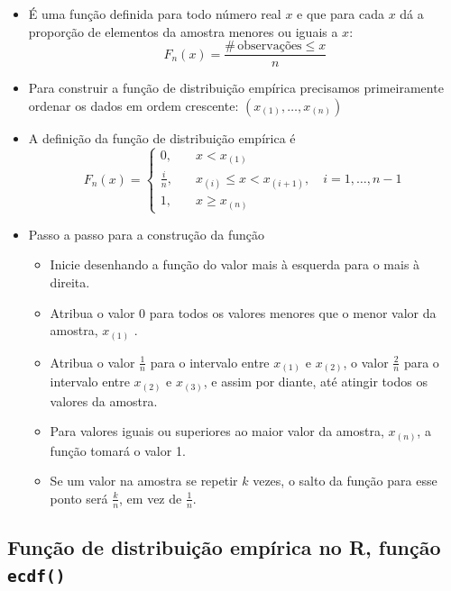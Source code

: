 \documentclass[
]{book}
\providecommand{\tightlist}{%
  \setlength{\itemsep}{0pt}\setlength{\parskip}{0pt}}
\begin{document}
\begin{itemize}
\item
  É uma função definida para todo número real \(x\) e que para cada \(x\)
  dá a proporção de elementos da amostra menores ou iguais a \(x\):
  \[F_{n}(x) = \frac{\# \, \text{observações} \leq x}{n}\]
\item
  Para construir a função de distribuição empírica precisamos
  primeiramente ordenar os dados em ordem crescente:
  \((x_{(1)},\ldots,x_{(n)})\)
\item
  A definição da função de distribuição empírica é
  \[F_{n}(x) = \begin{cases}
    0, & \quad x < x_{(1)} \\
    \frac{i}{n}, & \quad x_{(i)}\leq x < x_{(i+1)}, \quad i=1,\ldots,n-1 \\
    1, & \quad x\geq x_{(n)}
  \end{cases}\]
\item
  Passo a passo para a construção da função

  \begin{itemize}
  \tightlist
  \item
    Inicie desenhando a função do valor mais à esquerda para o mais
    à direita.
  \item
    Atribua o valor 0 para todos os valores menores que o menor
    valor da amostra, \(x_{(1)}\) .
  \item
    Atribua o valor \(\frac{1}{n}\) para o intervalo entre \(x_{(1)}\) e
    \(x_{(2)}\), o valor \(\frac{2}{n}\) para o intervalo entre
    \(x_{(2)}\) e \(x_{(3)}\), e assim por diante, até atingir todos os
    valores da amostra.
  \item
    Para valores iguais ou superiores ao maior valor da amostra,
    \(x_{(n)}\), a função tomará o valor 1.
  \item
    Se um valor na amostra se repetir \(k\) vezes, o salto da função
    para esse ponto será \(\frac{k}{n}\), em vez de \(\frac{1}{n}\).
  \end{itemize}
\end{itemize}

\subsection{\texorpdfstring{Função de distribuição empírica no R, função \texttt{ecdf()}}{Função de distribuição empírica no R, função ecdf()}}\label{funuxe7uxe3o-de-distribuiuxe7uxe3o-empuxedrica-no-r-funuxe7uxe3o-ecdf}
\end{document}
